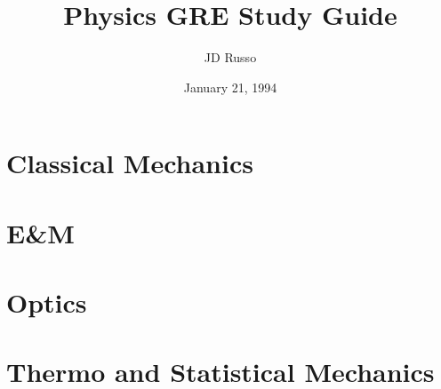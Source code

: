 \documentclass{article}      %
\title{Physics GRE Study Guide}  %
\author{JD Russo}      %
\date{January 21, 1994}      %
\begin{document}

\maketitle                   %

\section{Classical Mechanics}

\section{E\&M}

\section{Optics}

\section{Thermo and Statistical Mechanics}
\end{document}
